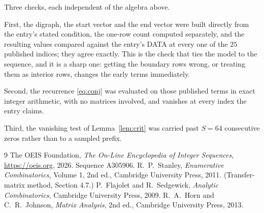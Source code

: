 \documentclass[11pt,a4paper]{article}
\theoremstyle{plain}
\theoremstyle{definition}
\begin{document}
Three checks, each independent of the algebra above.

First, the digraph, the start vector and the end vector were built directly from the
entry's stated condition, the one-row count computed separately, and the resulting values
compared against the entry's DATA at every one of the $25$ published indices; they
agree exactly. This is the check that ties the model to the sequence, and it is a sharp one:
getting the boundary rows wrong, or treating them as interior rows, changes the early terms
immediately.

Second, the recurrence \eqref{eq:conj} was evaluated on those published terms in exact
integer arithmetic, with no matrices involved, and vanishes at every index the entry claims.

Third, the vanishing test of Lemma~\ref{lem:crit} was carried past $S=64$ consecutive
zeros rather than to a sampled prefix.

\begin{thebibliography}{9}
 The OEIS Foundation, \emph{The On-Line Encyclopedia of Integer
Sequences}, \url{https://oeis.org}, 2026. Sequence A305906.
 R.~P.~Stanley, \emph{Enumerative Combinatorics}, Volume 1, 2nd ed.,
Cambridge University Press, 2011. (Transfer-matrix method, Section 4.7.)
 P.~Flajolet and R.~Sedgewick, \emph{Analytic Combinatorics}, Cambridge
University Press, 2009.
 R.~A.~Horn and C.~R.~Johnson, \emph{Matrix Analysis}, 2nd ed., Cambridge
University Press, 2013.
\end{thebibliography}
\end{document}
